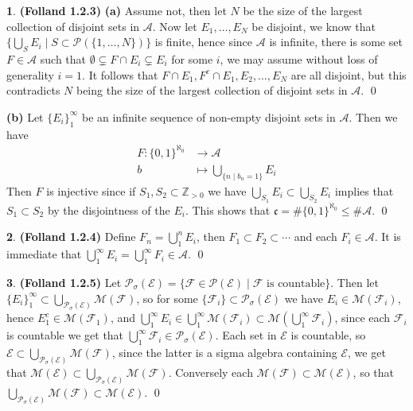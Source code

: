 \documentclass[10.5pt]{article}
\theoremstyle{definition}
\newtheorem{pb}{}
\newcommand{\set}[1]{\{#1\}}
\begin{document}
    \begin{pb} \textbf{(Folland 1.2.3)}
        \textbf{(a)} Assume not, then let \(N\) be the size of the largest collection of disjoint sets in \(\mathcal{A}\). Now let \(E_1,\hdots,E_N\) be disjoint, we know that \(\set{\bigcup_S E_i \mid S \subset \mathcal{P}(\set{1,\hdots,N})}\) is finite, hence since \(\mathcal{A}\) is infinite, there is some set \(F \in \mathcal{A}\) such that \(\emptyset \subsetneq F\cap E_i \subsetneq E_i\) for some \(i\), we may assume without loss of generality \(i = 1\). It follows that \(F\cap E_1,F^c\cap E_1,E_2,\hdots,E_N\) are all disjoint, but this contradicts \(N\) being the size of the largest collection of disjoint sets in \(\mathcal{A}\). \qed

        \textbf{(b)} Let \(\set{E_i}_1^\infty\) be an infinite sequence of non-empty disjoint sets in \(\mathcal{A}\). Then we have
        \begin{align*}
            F: \set{0,1}^{\aleph_0} &\to \mathcal{A} \\
            b &\mapsto \bigcup_{\set{n \mid b_n = 1}} E_i
        \end{align*}
        Then \(F\) is injective since if \(S_1,S_2 \subset \mathbb{Z}_{>0}\) we have \(\bigcup_{S_1}E_i \subset \bigcup_{S_2}E_i\) implies that \(S_1 \subset S_2\) by the disjointness of the \(E_i\). This shows that \(\mathfrak{c} = \# \set{0,1}^{\aleph_0} \leq \# \mathcal{A}\). \qed
    \end{pb}
    \begin{pb} \textbf{(Folland 1.2.4)}
        Define \(F_n = \bigcup_1^n E_i\), then \(F_1 \subset F_2 \subset \cdots\) and each \(F_i \in \mathcal{A}\). It is immediate that \(\bigcup_1^\infty E_i = \bigcup_1^\infty F_i \in \mathcal{A}\). \qed
    \end{pb}
    \begin{pb} \textbf{(Folland 1.2.5)}
        Let \(\mathcal{P}_\sigma(\mathcal{E}) = \set{\mathcal{F} \in \mathcal{P}(\mathcal{E}) \mid \mathcal{F} \text{ is countable}}\). Then let \(\set{E_i}_1^\infty \subset \bigcup_{\mathcal{P}_\sigma(\mathcal{E})} \mathcal{M}(\mathcal{F})\), so for some \(\set{\mathcal{F}_i} \subset \mathcal{P}_\sigma(\mathcal{E})\) we have \(E_i \in \mathcal{M}(\mathcal{F}_i)\), hence \(E_1^c \in \mathcal{M}(\mathcal{F}_1)\), and \(\bigcup_1^\infty E_i \in \bigcup_1^\infty \mathcal{M}(\mathcal{F}_i) \subset \mathcal{M}(\bigcup_1^\infty \mathcal{F}_i)\), since each \(\mathcal{F}_i\) is countable we get that \(\bigcup_1^\infty \mathcal{F}_i \in \mathcal{P}_\sigma(\mathcal{E})\). Each set in \(\mathcal{E}\) is countable, so \(\mathcal{E} \subset \bigcup_{\mathcal{P}_\sigma(\mathcal{E})}\mathcal{M}(\mathcal{F})\), since the latter is a sigma algebra containing \(\mathcal{E}\), we get that \(\mathcal{M}(\mathcal{E}) \subset \bigcup_{\mathcal{P}_\sigma(\mathcal{E})}\mathcal{M}(\mathcal{F})\). Conversely each \(\mathcal{M}(\mathcal{F}) \subset \mathcal{M}(\mathcal{E})\), so that \(\bigcup_{\mathcal{P}_\sigma(\mathcal{E})}\mathcal{M}(\mathcal{F}) \subset \mathcal{M}(\mathcal{E})\). \qed
    \end{pb}
\end{document}
